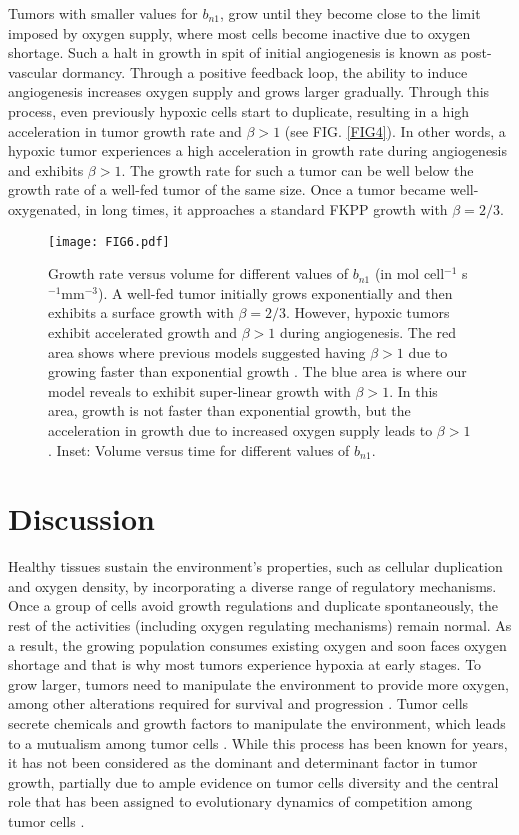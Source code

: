 \documentclass[aps,prl, superscriptaddress,groupedaddress]{revtex4}  %
\begin{document}
	Tumors with smaller values for $b_{n1}$, grow until they become close to the limit imposed by oxygen supply, where most cells become inactive due to oxygen shortage. Such a halt in growth in spit of initial angiogenesis is known as post-vascular dormancy.
	Through a positive feedback loop, the ability to induce angiogenesis increases oxygen supply and grows larger gradually. Through this process, even previously hypoxic cells start to duplicate, resulting in a high acceleration in tumor growth rate and $\beta>1$ (see FIG. \ref{FIG4}). In other words, a hypoxic tumor experiences a high acceleration in growth rate during angiogenesis and exhibits $\beta>1$. The growth rate for such a tumor can be well below the growth rate of a well-fed tumor of the same size.  Once a tumor became well-oxygenated, in long times, it approaches a standard FKPP growth with $\beta=2/3$.   
	\begin{figure} 
		\centering 
		\texttt{[image: FIG6.pdf]}
		\caption{Growth rate versus volume for different values of $b_{n1}$ (in mol cell$^{-1}$ s$^{-1}$mm$^{-3}$). A well-fed tumor initially grows exponentially and then exhibits a surface growth with $\beta=2/3$. However, hypoxic tumors exhibit accelerated growth and $\beta>1$ during angiogenesis. The red area shows where previous models suggested having $\beta>1$ due to growing faster than exponential growth \cite{durrett2010evolutionary, Victor2020superlinear}. The blue area is where our model reveals to exhibit super-linear growth with $\beta>1$. In this area, growth is not faster than exponential growth, but the acceleration in growth due to increased oxygen supply leads to $\beta>1$. Inset: Volume versus time for different values of $b_{n1}$.}
		\label{FIG6}
	\end{figure}
	
	
	\section{Discussion} 
	Healthy tissues sustain the environment's properties, such as cellular duplication and oxygen density, by incorporating a diverse range of regulatory mechanisms. Once a group of cells avoid growth regulations and duplicate spontaneously, the rest of the activities (including oxygen regulating mechanisms) remain normal. As a result, the growing population consumes existing oxygen and soon faces oxygen shortage and that is why most tumors experience hypoxia at early stages. To grow larger, tumors need to manipulate the environment to provide more oxygen, among other alterations required for survival and progression \cite{hanahan2000hallmarks, hanahan2011hallmarks}. Tumor cells secrete chemicals and growth factors to manipulate the environment, which leads to a mutualism among tumor cells \cite{archetti2019cooperation}. While this process has been known for years, it has not been considered as the dominant and determinant factor in tumor growth\cite{turajlic2019resolving}, partially due to ample evidence on tumor cells diversity and the central role that has been assigned to evolutionary dynamics of competition among tumor cells \cite{parker2020cell, zahir2020characterizing, lakatos2020evolutionary, watson2020evolutionary}.  
	
\end{document}
